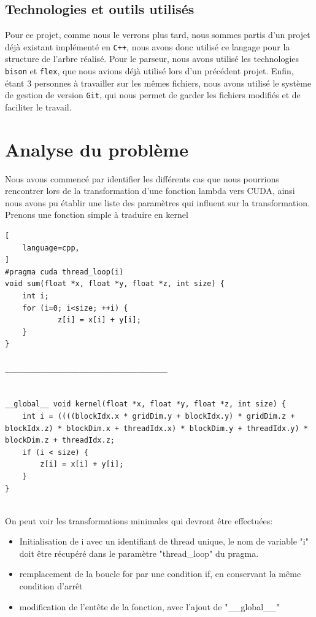 \documentclass{article}
\begin{document}
	\subsection{Technologies et outils utilisés}
	
	Pour ce projet, comme nous le verrons plus tard, nous sommes partis d'un projet déjà existant implémenté en \verb|C++|, nous avons donc utilisé ce langage pour la structure de l'arbre réalisé.
	Pour le parseur, nous avons utilisé les technologies \verb|bison| et \verb|flex|, que nous avions déjà utilisé lors d'un précédent projet.
	Enfin, étant 3 personnes à travailler sur les mêmes fichiers, nous avons utilisé le système de gestion de version \verb|Git|, qui nous permet de garder les fichiers modifiés et de faciliter le travail.
	
	\newpage	
	
	\section{Analyse du problème}
	Nous avons commencé par identifier les différents cas que nous pourrions rencontrer lors de la transformation d'une fonction lambda vers CUDA, ainsi nous avons pu établir une liste des paramètres qui influent sur la transformation.
	\\Prenons une fonction simple à traduire en kernel
		\begin{lstlisting}[
    language=cpp,
]
#pragma cuda thread_loop(i) 
void sum(float *x, float *y, float *z, int size) { 
	int i;
	for (i=0; i<size; ++i) {
			z[i] = x[i] + y[i];
	}
}

_____________________________________


__global__ void kernel(float *x, float *y, float *z, int size) { 
	int i = ((((blockIdx.x * gridDim.y + blockIdx.y) * gridDim.z + blockIdx.z) * blockDim.x + threadIdx.x) * blockDim.y + threadIdx.y) * blockDim.z + threadIdx.z;
	if (i < size) {
		z[i] = x[i] + y[i];
	}
}
	
	\end{lstlisting}	
	On peut voir les transformations minimales qui devront être effectuées:
	\begin{itemize}
	\item Initialisation de i avec un identifiant de thread unique, le nom de variable "i" doit être récupéré dans le paramètre "thread\_loop" du pragma.
	\item remplacement de la boucle for par une condition if, en conservant la même condition d'arrêt
	\item modification de l’entête de la fonction, avec l'ajout de "\_\_global\_\_"
	\end{itemize}
	
\end{document}
